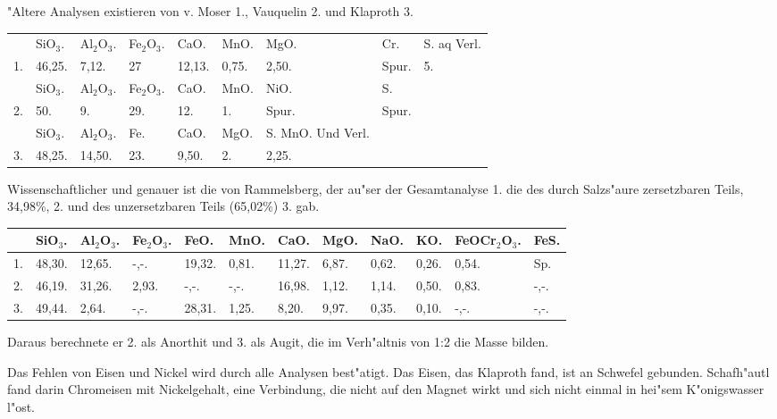 \documentclass[a4paper, 11pt, oneside]{article}
\begin{document}
"Altere Analysen existieren von v. Moser 1., Vauquelin 2. und Klaproth 3.
\begin{table}[!ht]
    \centering
    \footnotesize
    \begin{tabular}{p{3mm} l l l l l p{14mm} l p{13mm}}
         & SiO$_{3}$. & Al$_{2}$O$_{3}$. & Fe$_{2}$O$_{3}$. & CaO. & MnO. & MgO. & Cr. & S. aq Verl. \\
        1. & 46,25. & 7,12. & 27 & 12,13. & 0,75. & 2,50. & Spur. & 5. \\ \hline
         & SiO$_{3}$. & Al$_{2}$O$_{3}$. & Fe$_{2}$O$_{3}$. & CaO. & MnO. & NiO. & S. &  \\
        2. & 50. & 9. & 29. & 12. & 1. & Spur. & Spur. &  \\ \hline
         & SiO$_{3}$. & Al$_{2}$O$_{3}$. & Fe. & CaO. & MgO. & S. MnO. Und Verl. &  &  \\
        3. & 48,25. & 14,50. & 23. & 9,50. & 2. & 2,25. &  &  \\
    \end{tabular}
\end{table}

Wissenschaftlicher und genauer ist die von Rammelsberg, der au"ser der Gesamtanalyse 1. die des durch Salzs"aure zersetzbaren Teils, 34,98\%, 2. und des unzersetzbaren Teils (65,02\%) 3. gab.
\begin{table}[!ht]
    \centering
    \footnotesize
    \begin{tabular}{p{2mm} p{5mm} p{6mm} p{6mm} p{6mm} p{6mm} p{6mm} p{5mm} p{5mm} p{5mm} p{12mm} p{5mm}}
         & SiO$_{3}$. & Al$_{2}$O$_{3}$. & Fe$_{2}$O$_{3}$. & FeO. & MnO. & CaO. & MgO. & NaO. & KO. & FeOCr$_{2}$O$_{3}$. & FeS. \\ \hline
        1. & 48,30. & 12,65. & -,-. & 19,32. & 0,81. & 11,27. & 6,87. & 0,62. & 0,26. & 0,54. & Sp. \\
        2. & 46,19. & 31,26. & 2,93. & -,-. & -,-. & 16,98. & 1,12. & 1,14. & 0,50. & 0,83. & -,-. \\
        3. & 49,44. & 2,64. & -,-. & 28,31. & 1,25. & 8,20. & 9,97. & 0,35. & 0,10. & -,-. & -,-. \\
    \end{tabular}
\end{table}

Daraus berechnete er 2. als Anorthit und 3. als Augit, die im Verh"altnis von 1:2 die Masse bilden.

Das Fehlen von Eisen und Nickel wird durch alle Analysen best"atigt. Das Eisen, das Klaproth fand, ist an Schwefel gebunden. Schafh"autl fand darin Chromeisen mit Nickelgehalt, eine Verbindung, die nicht auf den Magnet wirkt und sich nicht einmal in hei"sem K"onigswasser l"ost.
\footnotesize
\end{document}
